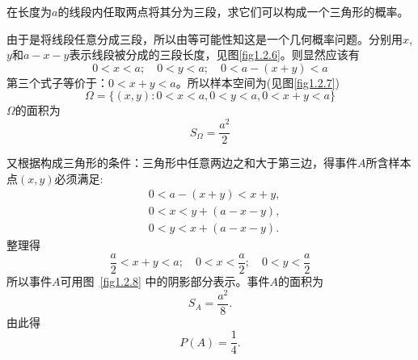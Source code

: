 \begin{example}
    在长度为$a$的线段内任取两点将其分为三段，求它们可以构成一个三角形的概率。
\end{example}

\begin{solution}
    由于是将线段任意分成三段，所以由等可能性知这是一个几何概率问题。分别用$x$,$y$和$a - x - y$表示线段被分成的三段长度，见图\ref{fig1.2.6}。则显然应该有
    \[ 0 < x < a; \quad 0 < y < a; \quad 0 < a - (x + y) < a \]
    第三个式子等价于：$0 < x + y < a$。所以样本空间为(见图\ref{fig1.2.7})
    \[ \Omega = \{(x, y): 0 < x < a, 0 < y < a, 0 < x + y < a\} \]
    $\Omega$的面积为
    \[ S_\Omega = \frac{a^2}{2} \]

    又根据构成三角形的条件：三角形中任意两边之和大于第三边，得事件$A$所含样本点$(x,y)$必须满足:
    \begin{align*}
         & 0 < a - (x + y) < x + y, \\
         & 0 < x < y + (a - x - y), \\
         & 0 < y < x + (a - x - y).
    \end{align*}
    整理得
    \[ \frac{a}{2} < x + y < a;\quad 0 < x < \frac{a}{2}; \quad 0 < y < \frac{a}{2} \]
    所以事件$A$可用图~\ref{fig1.2.8} 中的阴影部分表示。事件$A$的面积为
    \[ S_A = \frac{a^2}{8}. \]
    由此得
    \[P(A) = \frac1{4}. \]
\end{solution}

